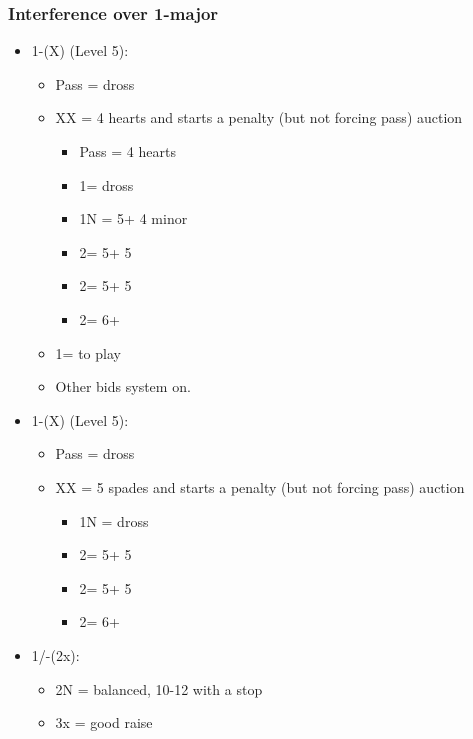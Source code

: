 \documentclass[a4paper,14pt]{extarticle}
\begin{document}
\subsubsection{Interference over 1-major}
\label{sec:intf:1M}

{\it
\begin{itemize}
\item 1\hearts-(X) (Level 5):
	\begin{itemize}
	\item Pass = dross
	\item XX = 4 hearts and starts a penalty (but not forcing pass) auction
		\begin{itemize}
		\item Pass = 4 hearts
		\item 1\spades = dross
		\item 1N = 5\spades + 4 minor
		\item 2\clubs = 5\spades + 5\clubs
		\item 2\diamonds = 5\spades + 5\diamonds
		\item 2\spades = 6+\spades
		\end{itemize}
	\item 1\spades = to play
	\item Other bids system on.
	\end{itemize}
\item 1\spades-(X) (Level 5):
	\begin{itemize}
	\item Pass = dross
	\item XX = 5 spades and starts a penalty (but not forcing pass) auction
		\begin{itemize}
		\item 1N = dross
		\item 2\clubs = 5\hearts + 5\clubs
		\item 2\diamonds = 5\hearts + 5\diamonds
		\item 2\hearts = 6+\hearts
		\end{itemize}
	\end{itemize}
\end{itemize}
}
\begin{itemize}
\item 1\hearts/\spades-(2x):
	\begin{itemize}
	\item 2N = balanced, 10-12 with a stop
	\item 3x = good raise
	\end{itemize}
	 
\end{itemize}
\end{document}
